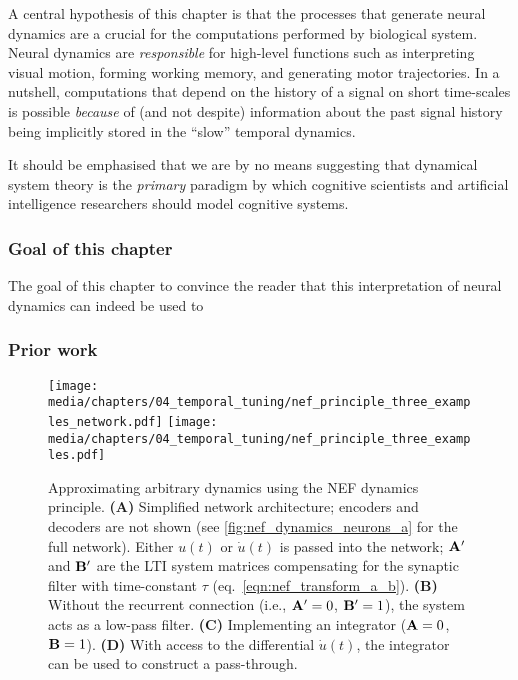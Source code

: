 A central hypothesis of this chapter is that the processes that generate neural dynamics are a crucial for the computations performed by biological system.
Neural dynamics are \emph{responsible} for high-level functions such as interpreting visual motion, forming working memory, and generating motor trajectories.
In a nutshell, computations that depend on the history of a signal on short time-scales is possible \emph{because} of (and not despite) information about the past signal history being implicitly stored in the \enquote{slow} temporal dynamics.

It should be emphasised that we are by no means suggesting that dynamical system theory is the \emph{primary} paradigm by which cognitive scientists and artificial intelligence researchers should model cognitive systems.



\subsubsection{Goal of this chapter}

The goal of this chapter to convince the reader that this interpretation of neural dynamics can indeed be used to 

\subsubsection{Prior work}

\begin{figure}
	\centering
	\texttt{[image: media/chapters/04\_temporal\_tuning/nef\_principle\_three\_examples\_network.pdf]}%
	\kern-124mm\texttt{[image: media/chapters/04\_temporal\_tuning/nef\_principle\_three\_examples.pdf]}
	\caption[Approximating arbitrary dynamics using the NEF dynamics principle]{Approximating arbitrary dynamics using the NEF dynamics principle.
	\textbf{(A)} Simplified network architecture; encoders and decoders are not shown (see \cref{fig:nef_dynamics_neurons_a} for the full network).
	Either $u(t)$ or $\dot u(t)$ is passed into the network; $\mathbf{A'}$ and $\mathbf{B'}$ are the LTI system matrices compensating for the synaptic filter with time-constant $\tau$ (eq.~\ref{eqn:nef_transform_a_b}).
	\textbf{(B)} Without the recurrent connection (i.e., $\mathbf{A'} = 0$, $\mathbf{B'} = 1$), the system acts as a low-pass filter.
	\textbf{(C)} Implementing an integrator ($\mathbf{A} = 0$, $\mathbf{B} = 1$).
	\textbf{(D)} With access to the differential $\dot u(t)$, the integrator can be used to construct a pass-through.
	}
\end{figure}

